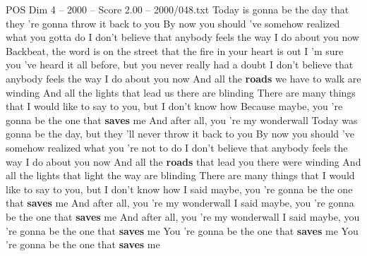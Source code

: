 \begin{textsample}{POS Dim 4 – 2000 – Score 2.00 – 2000/048.txt}  \label{ex:f4_pos_008}
Today is gonna be the day that they 're gonna throw it back to you By now you should 've somehow realized what you gotta do I don't believe that anybody feels the way I do about you now Backbeat, the word is on the street that the fire in your heart is out I 'm sure you 've heard it all before, but you never really had a doubt I don't believe that anybody feels the way I do about you now And all the \textbf{roads} we have to walk are winding And all the lights that lead us there are blinding There are many things that I would like to say to you, but I don't know how Because maybe, you 're gonna be the one that \textbf{saves} me And after all, you 're my wonderwall Today was gonna be the day, but they 'll never throw it back to you By now you should 've somehow realized what you 're not to do I don't believe that anybody feels the way I do about you now And all the \textbf{roads} that lead you there were winding And all the lights that light the way are blinding There are many things that I would like to say to you, but I don't know how I said maybe, you 're gonna be the one that \textbf{saves} me And after all, you 're my wonderwall I said maybe, you 're gonna be the one that \textbf{saves} me And after all, you 're my wonderwall I said maybe, you 're gonna be the one that \textbf{saves} me You 're gonna be the one that \textbf{saves} me You 're gonna be the one that \textbf{saves} me

\end{textsample}
